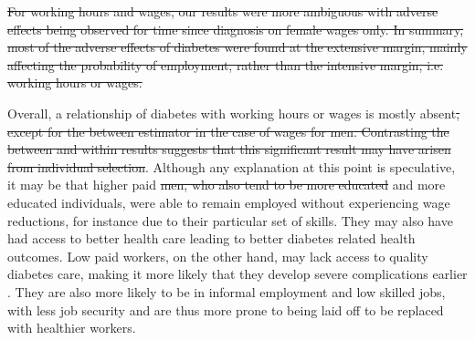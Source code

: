 \documentclass[12pt,english]{article}
\providecommand{\DIFaddtex}[1]{{\protect\color{blue}#1}} %
\providecommand{\DIFdeltex}[1]{{\protect\color{red}\sout{#1}}}                      %
\providecommand{\DIFaddbegin}{} %
\providecommand{\DIFaddend}{} %
\providecommand{\DIFdelbegin}{} %
\providecommand{\DIFdelend}{} %
\providecommand{\DIFadd}[1]{\texorpdfstring{\DIFaddtex{#1}}{#1}} %
\providecommand{\DIFdel}[1]{\texorpdfstring{\DIFdeltex{#1}}{}} %
\begin{document}
\DIFdelbegin \DIFdel{For working hours and wages, our results were more ambiguous with adverse effects being observed for time since diagnosis on female wages only. In summary, most of the adverse effects of diabetes were found at the extensive margin, mainly affecting the probability of employment, rather than the intensive margin, i.e. working hours or wages. 
}\DIFdelend 

Overall, a relationship of diabetes with working hours or wages is mostly absent\DIFdelbegin \DIFdel{, except for the between estimator in the case of wages for men. Contrasting the between and within results suggests that this significant result may have arisen from individual selection}\DIFdelend . Although any explanation at this point is speculative, it may be that higher paid \DIFdelbegin \DIFdel{men, who also tend to be more educated }\DIFdelend \DIFaddbegin \DIFadd{and more educated individuals}\DIFaddend , were able to remain employed without experiencing wage reductions, for instance due to their particular set of skills. They may also have had access to better health care leading to better diabetes related health outcomes. Low paid workers, on the other hand, may lack access to quality diabetes care, making it more likely that they develop severe complications earlier \parencite{Flores-Hernandez2015}. They are also more likely to be in informal employment and low skilled jobs, with less job security and are thus more prone to being laid off to be replaced with healthier workers.
\end{document}

